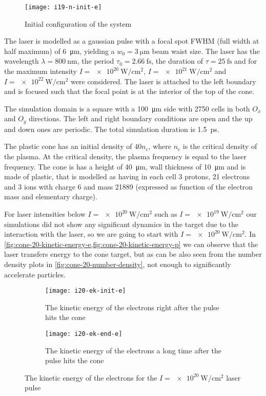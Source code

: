\documentclass[12pt, class=report, crop=false]{standalone}
\begin{document}
\begin{figure}[hb]
    \centering
    \texttt{[image: i19-n-init-e]}
    \caption{Initial configuration of the system}%
    \label{fig:initial-plasma-laser}
\end{figure}

The laser is modelled as a gaussian pulse with a focal spot FWHM
(full width at half maximum) of \SI{6}{\micro\metre}, yielding
a \(w_0=\SI{3}{\micro\metre}\) beam waist size. The laser has the
wavelength \(\lambda=\SI{800}{\nano\metre}\), the period
\(\tau_0=\SI{2.66}{\femto\second}\), the duration of
\(\tau=\SI{25}{\femto\second}\) and for the maximum intensity
\(I=\SI{e20}{\watt\per\centi\metre\squared}\),
\(I=\SI{e21}{\watt\per\centi\metre\squared}\) and
\(I=\SI{e22}{\watt\per\centi\metre\squared}\) were considered.
The laser is attached to the left boundary and is focused such
that the focal point is at the interior of the top of the cone.

The simulation domain is a square with a \SI{100}{\micro\metre}
side with 2750 cells in both \(O_x\) and \(O_y\) directions.
The left and right boundary conditions are open and the up and
down ones are periodic. The total simulation duration is \SI{1.5}{\pico\second}.

The plastic cone has an initial density of \(40n_c\), where \(n_c\)
is the critical density of the plasma. At the critical density, the
plasma frequency is equal to the laser frequency. The cone is has a
height of \SI{40}{\micro\metre}, wall thickness of \SI{10}{\micro\metre}
and is made of plastic, that is modelled as having in each cell 3 protons,
21 electrons and 3 ions with charge 6 and mass 21889
(expressed as function of the electron mass and elementary charge).

For laser intensities below \(I=\SI{e20}{\watt\per\centi\metre\squared}\)
such as \(I=\SI{e19}{\watt\per\centi\metre\squared}\)
our simulations did not show any significant dynamics in the target due to the
interaction with the laser, so we are going to start with
\(I=\SI{e20}{\watt\per\centi\metre\squared}\). In
\cref{fig:cone-20-kinetic-energy-e,fig:cone-20-kinetic-energy-p} we can
observe that the laser transfers energy to the cone target, but as can be
also seen from the number density plots in \cref{fig:cone-20-number-density},
not enough to significantly accelerate particles.

\begin{figure}[h]
  \centering
  \begin{subfigure}[b]{0.475\textwidth}
    \centering
    \texttt{[image: i20-ek-init-e]}
    \caption{The kinetic energy of the electrons right after the pulse
    hits the cone}%
  \end{subfigure}
  \hfill
  \begin{subfigure}[b]{0.475\textwidth}
    \centering
    \texttt{[image: i20-ek-end-e]}
    \caption{The kinetic energy of the electrons a long time after the pulse
    hits the cone}%
  \end{subfigure}
  \caption{The kinetic energy of the electrons for the
  \(I=\SI{e20}{\watt\per\centi\metre\squared}\) laser pulse}%
  \label{fig:cone-20-kinetic-energy-e}%
\end{figure}
\end{document}
